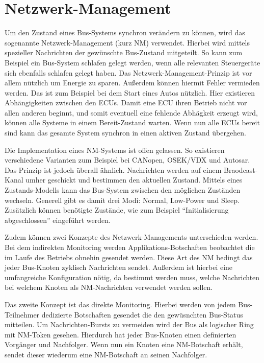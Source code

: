 \documentclass[
  a4paper,					    %
  twoside,
  DIV=calc,     				%
  bibliography=totoc,
  cleardoublepage=empty,
  ngerman,     					%
  final       					%
]{scrbook}
\begin{document}
\section{Netzwerk-Management}
\label{sec:Netzwerk-Management}
Um den Zustand eines Bus-Systems synchron verändern zu können, wird das sogenannte Netzwerk-Management (kurz NM) verwendet. Hierbei wird mittels spezieller Nachrichten der gewünschte Bus-Zustand mitgeteilt. So kann zum Beispiel ein Bus-System schlafen gelegt werden, wenn alle relevanten Steuergeräte sich ebenfalls schlafen gelegt haben. Das Netzwerk-Management-Prinzip ist vor allem nützlich um Energie zu sparen. Außerdem können hiermit Fehler vermieden werden. Das ist zum Beispiel bei dem Start eines Autos nützlich. Hier existieren Abhängigkeiten zwischen den ECUs. Damit eine ECU ihren Betrieb nicht vor allen anderen beginnt, und somit eventuell eine fehlende Abhägkeit erzeugt wird, können alle Systeme in einem Bereit-Zustand warten. Wenn nun alle ECUs bereit sind kann das gesamte System synchron in einen aktiven Zustand übergehen.

Die Implementation eines NM-Systems ist offen gelassen. So existieren verschiedene Varianten zum Beispiel bei CANopen, OSEK/VDX und Autosar. Das Prinzip ist jedoch überall ähnlich. Nachrichten werden auf einem Braodcast-Kanal umher geschickt und bestimmen den aktuellen Zustand. Mittels eines Zustands-Modells kann das Bus-System zwischen den möglichen Zuständen wechseln. Generell gibt es damit drei Modi: Normal, Low-Power und Sleep. Zusätzlich können benötigte Zustände, wie zum Beispiel "`Initialisierung abgeschlossen"' eingeführt werden.

Zudem können zwei Konzepte des Netzwerk-Managements unterschieden werden. Bei dem indirekten Monitoring werden Applikations-Botschaften beobachtet die im Laufe des Betriebs ohnehin gesendet werden. Diese Art des NM bedingt das jeder Bus-Knoten zyklisch Nachrichten sendet. Außerdem ist hierbei eine umfangreiche Konfiguration nötig, da bestimmt werden muss, welche Nachrichten bei welchem Knoten als NM-Nachrichten verwendet werden sollen.

Das zweite Konzept ist das direkte Monitoring. Hierbei werden von jedem Bus-Teilnehmer dedizierte Botschaften gesendet die den gewüsnchten Bus-Status mitteilen. Um Nachrichten-Bursts zu vermeiden wird der Bus als logischer Ring mit NM-Token gesehen. Hierdurch hat jeder Bus-Knoten einen definierten Vorgänger und Nachfolger. Wenn nun ein Knoten eine NM-Botschaft erhält, sendet dieser wiederum eine NM-Botschaft an seinen Nachfolger.
\end{document}
